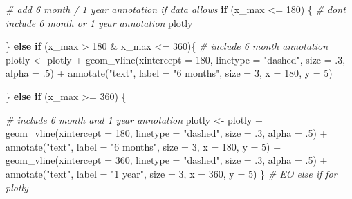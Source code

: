 \documentclass[
  11 pt,
  openany]{book}
\newenvironment{Shaded}{\begin{snugshade}}{\end{snugshade}}
\newcommand{\AttributeTok}[1]{\textcolor[rgb]{0.77,0.63,0.00}{#1}}
\newcommand{\CommentTok}[1]{\textcolor[rgb]{0.56,0.35,0.01}{\textit{#1}}}
\newcommand{\ControlFlowTok}[1]{\textcolor[rgb]{0.13,0.29,0.53}{\textbf{#1}}}
\newcommand{\DecValTok}[1]{\textcolor[rgb]{0.00,0.00,0.81}{#1}}
\newcommand{\FunctionTok}[1]{\textcolor[rgb]{0.00,0.00,0.00}{#1}}
\newcommand{\NormalTok}[1]{#1}
\newcommand{\OtherTok}[1]{\textcolor[rgb]{0.56,0.35,0.01}{#1}}
\newcommand{\SpecialCharTok}[1]{\textcolor[rgb]{0.00,0.00,0.00}{#1}}
\newcommand{\StringTok}[1]{\textcolor[rgb]{0.31,0.60,0.02}{#1}}
\begin{document}
\begin{Shaded}
\begin{Highlighting}[]
\CommentTok{\# add 6 month / 1 year annotation if data allows}
\ControlFlowTok{if}\NormalTok{ (x\_max }\SpecialCharTok{\textless{}=} \DecValTok{180}\NormalTok{) \{}
  \CommentTok{\# don\textquotesingle{}t include 6 month or 1 year annotation}
\NormalTok{  plotly}
  
\NormalTok{\} }\ControlFlowTok{else} \ControlFlowTok{if}\NormalTok{ (x\_max }\SpecialCharTok{\textgreater{}} \DecValTok{180} \SpecialCharTok{\&}\NormalTok{ x\_max }\SpecialCharTok{\textless{}=} \DecValTok{360}\NormalTok{)\{}
  \CommentTok{\# include 6 month annotation}
\NormalTok{  plotly }\OtherTok{\textless{}{-}}\NormalTok{ plotly }\SpecialCharTok{+}
    \FunctionTok{geom\_vline}\NormalTok{(}\AttributeTok{xintercept =} \DecValTok{180}\NormalTok{, }
               \AttributeTok{linetype =} \StringTok{"dashed"}\NormalTok{, }\AttributeTok{size =}\NormalTok{ .}\DecValTok{3}\NormalTok{, }\AttributeTok{alpha =}\NormalTok{ .}\DecValTok{5}\NormalTok{) }\SpecialCharTok{+}
    \FunctionTok{annotate}\NormalTok{(}\StringTok{"text"}\NormalTok{, }\AttributeTok{label =} \StringTok{"6 months"}\NormalTok{,  }\AttributeTok{size =} \DecValTok{3}\NormalTok{,}
             \AttributeTok{x =} \DecValTok{180}\NormalTok{, }\AttributeTok{y =} \DecValTok{5}\NormalTok{)}
  
\NormalTok{\} }\ControlFlowTok{else} \ControlFlowTok{if}\NormalTok{ (x\_max }\SpecialCharTok{\textgreater{}=} \DecValTok{360}\NormalTok{) \{}
  
  \CommentTok{\# include 6 month and 1 year annotation}
\NormalTok{  plotly }\OtherTok{\textless{}{-}}\NormalTok{ plotly }\SpecialCharTok{+}
    \FunctionTok{geom\_vline}\NormalTok{(}\AttributeTok{xintercept =} \DecValTok{180}\NormalTok{, }
               \AttributeTok{linetype =} \StringTok{"dashed"}\NormalTok{, }\AttributeTok{size =}\NormalTok{ .}\DecValTok{3}\NormalTok{, }\AttributeTok{alpha =}\NormalTok{ .}\DecValTok{5}\NormalTok{) }\SpecialCharTok{+}
    \FunctionTok{annotate}\NormalTok{(}\StringTok{"text"}\NormalTok{, }\AttributeTok{label =} \StringTok{"6 months"}\NormalTok{, }\AttributeTok{size =} \DecValTok{3}\NormalTok{,}
             \AttributeTok{x =} \DecValTok{180}\NormalTok{, }\AttributeTok{y =} \DecValTok{5}\NormalTok{) }\SpecialCharTok{+}
    \FunctionTok{geom\_vline}\NormalTok{(}\AttributeTok{xintercept =} \DecValTok{360}\NormalTok{,}
               \AttributeTok{linetype =} \StringTok{"dashed"}\NormalTok{, }\AttributeTok{size =}\NormalTok{ .}\DecValTok{3}\NormalTok{, }\AttributeTok{alpha =}\NormalTok{ .}\DecValTok{5}\NormalTok{) }\SpecialCharTok{+}
    \FunctionTok{annotate}\NormalTok{(}\StringTok{"text"}\NormalTok{, }\AttributeTok{label =} \StringTok{"1 year"}\NormalTok{, }\AttributeTok{size =} \DecValTok{3}\NormalTok{,}
             \AttributeTok{x =} \DecValTok{360}\NormalTok{, }\AttributeTok{y =} \DecValTok{5}\NormalTok{)}
\NormalTok{\} }\CommentTok{\# EO else if for plotly}


\end{Highlighting}
\end{Shaded}
\end{document}

